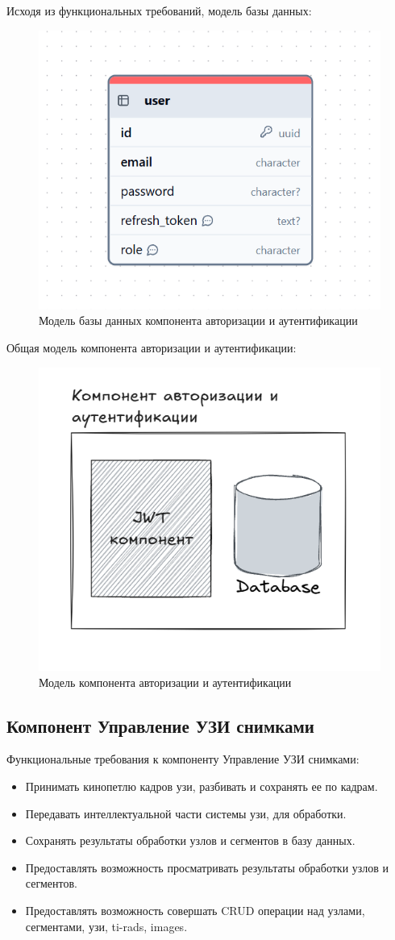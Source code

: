 Исходя из функциональных требований, модель базы данных:
\begin{figure}[H]%
	\begin{center}
		\includegraphics[width=.5\columnwidth]{./img/new/auth_db.png}%
	\end{center}
	\caption{Модель базы данных компонента авторизации и аутентификации}%
	\label{pic:auth_db}%
\end{figure}

Общая модель компонента авторизации и аутентификации:
\begin{figure}[H]%
	\begin{center}
		\includegraphics[width=.6\columnwidth]{./img/new/auth_model.png}%
	\end{center}
	\caption{Модель компонента авторизации и аутентификации}%
	\label{pic:auth_model}%
\end{figure}


\subsection{Компонент Управление УЗИ снимками}

Функциональные требования к компоненту Управление УЗИ снимками:
\begin{itemize}
  \item Принимать кинопетлю кадров узи, разбивать и сохранять ее по кадрам.
  \item Передавать интеллектуальной части системы узи, для обработки.
  \item Сохранять результаты обработки узлов и сегментов в базу данных.
  \item Предоставлять возможность просматривать результаты обработки узлов и сегментов.
  \item Предоставлять возможность совершать CRUD операции над узлами, сегментами, узи, ti-rads, images.
\end{itemize}

